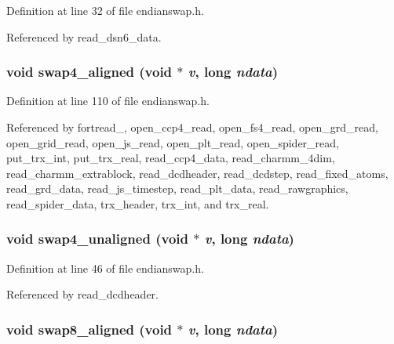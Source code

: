 Definition at line 32 of file endianswap.h.

Referenced by read\_\-dsn6\_\-data.
\subsubsection{\setlength{\rightskip}{0pt plus 5cm}void swap4\_\-aligned (void $\ast$ {\em v}, long {\em ndata})\hspace{0.3cm}{\tt  [static]}}\label{endianswap_8h_a4}




Definition at line 110 of file endianswap.h.

Referenced by fortread\_, open\_\-ccp4\_\-read, open\_\-fs4\_\-read, open\_\-grd\_\-read, open\_\-grid\_\-read, open\_\-js\_\-read, open\_\-plt\_\-read, open\_\-spider\_\-read, put\_\-trx\_\-int, put\_\-trx\_\-real, read\_\-ccp4\_\-data, read\_\-charmm\_\-4dim, read\_\-charmm\_\-extrablock, read\_\-dcdheader, read\_\-dcdstep, read\_\-fixed\_\-atoms, read\_\-grd\_\-data, read\_\-js\_\-timestep, read\_\-plt\_\-data, read\_\-rawgraphics, read\_\-spider\_\-data, trx\_\-header, trx\_\-int, and trx\_\-real.
\subsubsection{\setlength{\rightskip}{0pt plus 5cm}void swap4\_\-unaligned (void $\ast$ {\em v}, long {\em ndata})\hspace{0.3cm}{\tt  [static]}}\label{endianswap_8h_a1}




Definition at line 46 of file endianswap.h.

Referenced by read\_\-dcdheader.
\subsubsection{\setlength{\rightskip}{0pt plus 5cm}void swap8\_\-aligned (void $\ast$ {\em v}, long {\em ndata})\hspace{0.3cm}{\tt  [static]}}\label{endianswap_8h_a5}




